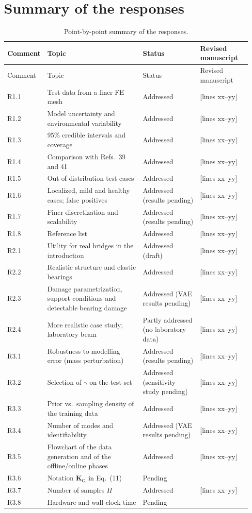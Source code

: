 \documentclass[11pt]{article}
\newcommand{\tbd}[1]{\textcolor{note}{\textsf{[#1]}}}
\newcommand{\lines}[1]{\tbd{lines #1}}
\begin{document}
\section{Summary of the responses}
{\small
\begin{longtable}{p{1.55cm}p{6.0cm}p{3.0cm}p{3.6cm}}
\caption{Point-by-point summary of the responses.}\label{tab:summary}\\
\toprule
Comment & Topic & Status & Revised manuscript \\
\midrule
\endfirsthead
\toprule
Comment & Topic & Status & Revised manuscript \\
\midrule
\endhead
R1.1 & Test data from a finer FE mesh & Addressed & \lines{xx--yy} \\
R1.2 & Model uncertainty and environmental variability & Addressed & \lines{xx--yy} \\
R1.3 & 95\% credible intervals and coverage & Addressed & \lines{xx--yy} \\
R1.4 & Comparison with Refs.\ 39 and 41 & Addressed & \lines{xx--yy} \\
R1.5 & Out-of-distribution test cases & Addressed & \lines{xx--yy} \\
R1.6 & Localized, mild and healthy cases; false positives & Addressed (results pending) & \lines{xx--yy} \\
R1.7 & Finer discretization and scalability & Addressed (results pending) & \lines{xx--yy} \\
R1.8 & Reference list & Addressed & \lines{xx--yy} \\
R2.1 & Utility for real bridges in the introduction & Addressed (draft) & \lines{xx--yy} \\
R2.2 & Realistic structure and elastic bearings & Addressed & \lines{xx--yy} \\
R2.3 & Damage parametrization, support conditions and detectable bearing damage & Addressed (VAE results pending) & \lines{xx--yy} \\
R2.4 & More realistic case study; laboratory beam & Partly addressed (no laboratory data) & \lines{xx--yy} \\
R3.1 & Robustness to modelling error (mass perturbation) & Addressed (results pending) & \lines{xx--yy} \\
R3.2 & Selection of $\gamma$ on the test set & Addressed (sensitivity study pending) & \lines{xx--yy} \\
R3.3 & Prior vs.\ sampling density of the training data & Addressed & \lines{xx--yy} \\
R3.4 & Number of modes and identifiability & Addressed (VAE results pending) & \lines{xx--yy} \\
R3.5 & Flowchart of the data generation and of the offline/online phases & Addressed & \lines{xx--yy} \\
R3.6 & Notation $\mathbf{K}_{\mathrm{G}}$ in Eq.~(11) & Pending & \\
R3.7 & Number of samples $H$ & Addressed & \lines{xx--yy} \\
R3.8 & Hardware and wall-clock time & Pending & \\
\bottomrule
\end{longtable}
}
\end{document}
